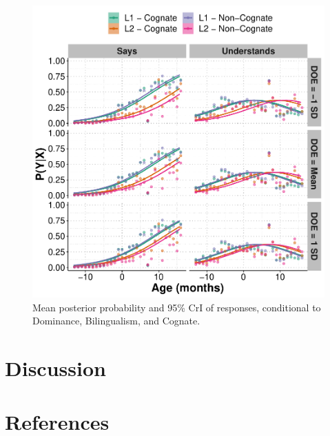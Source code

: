 \documentclass[
  english,
  man,man,floatsintext]{apa6}
\begin{document}
\begin{figure}

{\centering \includegraphics[width=20cm]{trajectories_manuscript_files/figure-latex/marginalmeans-1} 

}

\caption{Mean posterior probability and 95\% CrI of responses, conditional to Dominance, Bilingualism, and Cognate.}\label{fig:marginalmeans}
\end{figure}

\hypertarget{discussion}{%
\section{Discussion}\label{discussion}}

\hypertarget{references}{%
\section{References}\label{references}}

\begingroup
\setlength{\parindent}{-0.5in}
\setlength{\leftskip}{0.5in}
\end{document}
